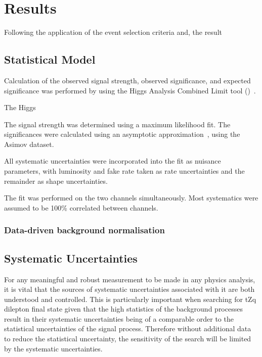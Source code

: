 \chapter{Results}\label{chapter:results}
Following the application of the event selection criteria and, the result 

\section{Statistical Model}\label{sec:statisticalModel}
Calculation of the observed signal strength, observed significance, and expected significance was performed by using the Higgs Analysis Combined Limit tool (\combine{})~\cite{Combine}. 

The Higgs 

The signal strength was determined using a maximum likelihood fit.  
The significances were calculated using an asymptotic approximation~\cite{AsymptoticFormulae}, using the Asimov dataset.

All systematic uncertainties were incorporated into the fit as nuisance parameters, with luminosity and fake rate taken as rate uncertainties and the remainder as shape uncertainties.
 
The fit was performed on the two channels simultaneously. 
Most systematics were assumed to be 100\% correlated between channels.

\subsection{Data-driven background normalisation}\label{subsec:combineNormalisation}

\section{Systematic Uncertainties}\label{chapter:systematics}

For any meaningful and robust measurement to be made in any physics analysis, it is vital that the sources of systematic uncertainties associated with it are both understood and controlled.
This is particularly important when searching for tZq dilepton final state given that the high statistics of the background processes result in their systematic uncertainties being of a comparable order to the statistical uncertainties of the signal process.
Therefore without additional data to reduce the statistical uncertainty, the sensitivity of the search will be limited by the systematic uncertainties.

